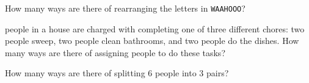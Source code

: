 \documentclass[addpoints,12pt]{exam}
\begin{document}
\begin{questions}
\addpoints

\vspace{1.5in}


\question[1] How many ways are there of rearranging the letters in \texttt{WAAHOOO}?

\vspace{1.2in}

 people in a house are charged with completing one of three different chores: two people sweep, two people clean bathrooms, and two people do the dishes. How many ways are there of assigning people to do these tasks?

\vspace{2in}

\question[1] How many ways are there of splitting 6 people into 3 pairs? 
\end{questions}
\end{document}
